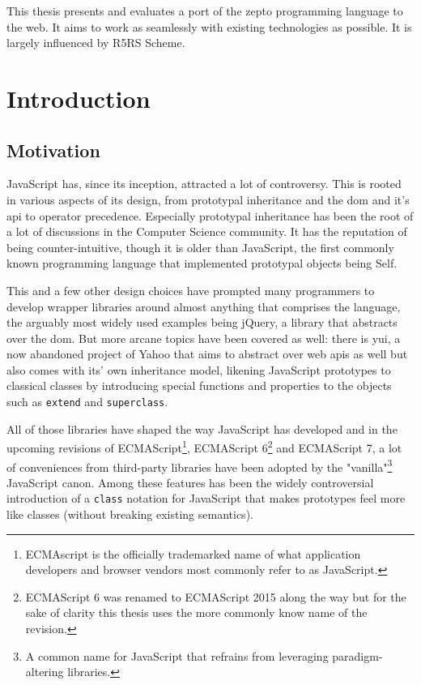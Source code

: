 \documentclass[oneside,11pt,xetex]{scrbook}
\begin{document}

This thesis presents and evaluates a port of the zepto programming language to the web. It aims to
work as seamlessly with existing technologies as possible. It is largely influenced by R5RS Scheme.

\tableofcontents

\printglossary[type=\acronymtype,title=Abbreviations]

\mainmatter

\pagestyle{headings}

\chapter{Introduction}
\label{chap:intro}

\section{Motivation}
\label{sec:Motivation}

JavaScript has, since its inception, attracted a lot of controversy. This is rooted
in various aspects of its design, from prototypal inheritance and the \gls{dom} and it's
\gls{api} to operator precedence. Especially prototypal inheritance  has been the root
of a lot of discussions in the Computer Science community. It has the reputation of
being counter-intuitive, though it is older than JavaScript, the first commonly known
programming language that implemented prototypal objects being Self.

This and a few other design choices have prompted many programmers to develop
wrapper libraries around almost anything that comprises the language, the arguably
most widely used examples being jQuery, a library that abstracts over the \gls{dom}.
But more arcane topics have been covered as well: there is \gls{yui}, a now abandoned
project of Yahoo that aims to abstract over web \gls{api}s as well but also comes with
its' own inheritance model, likening JavaScript prototypes to classical classes by
introducing special functions and properties to the objects such as \texttt{extend}
and \texttt{superclass}.

All of those libraries have shaped the way JavaScript has developed and in the
upcoming revisions of ECMAScript\footnote{ECMAscript is the officially trademarked
name of what application developers and browser vendors most commonly refer to as
JavaScript.}, ECMAScript 6\footnote{ECMAScript 6 was renamed to ECMAScript 2015
along the way but for the sake of clarity this thesis uses the more commonly
know name of the revision.} and ECMAScript 7, a lot of conveniences from third-party
libraries have been adopted by the "vanilla"\footnote{A common name for JavaScript
that refrains from leveraging paradigm-altering libraries.} JavaScript canon.
Among these features has been the widely controversial introduction of a \texttt{class}
notation for JavaScript that makes prototypes feel more like classes (without
breaking existing semantics).
\end{document}
